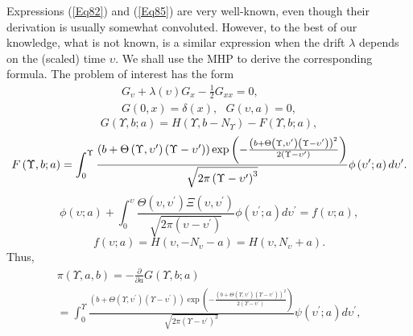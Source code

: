 \documentclass{article}
\begin{document}
Expressions (\ref{Eq82}) and (\ref{Eq85}) are very well-known, even though
their derivation is usually somewhat convoluted. However, to the best of our
knowledge, what is not known, is a similar expression when the drift $%
\lambda $ depends on the (scaled) time $\upsilon $. We shall use the MHP to
derive the corresponding formula. The problem of interest has the form%
\begin{equation}
\begin{array}{c}
G_{\upsilon }+\lambda \left( \upsilon \right) G_{x}-\frac{1}{2}G_{xx}=0, \\ 
G\left( 0,x\right) =\delta \left( x\right) ,\ \ \ G(\upsilon ,a)=0,%
\end{array}
\label{Eq86}
\end{equation}%
\begin{equation}
G\left( \Upsilon ,b;a\right) =H\left( \Upsilon ,b-N_{\Upsilon }\right)
-F\left( \Upsilon ,b;a\right) ,  \label{Eq87}
\end{equation}%
\begingroup\small
\begin{equation}
F\left( \Upsilon ,b;a\right) =\int_{0}^{\Upsilon }\frac{\left( b+\Theta
\left( \Upsilon ,\upsilon ^{\prime }\right) \left( \Upsilon -\upsilon
^{\prime }\right) \right) \exp \left( -\frac{\left( b+\Theta \left( \Upsilon
,\upsilon ^{\prime }\right) \left( \Upsilon -\upsilon ^{\prime }\right)
\right) ^{2}}{2\left( \Upsilon -\upsilon ^{\prime }\right) }\right) }{\sqrt{%
2\pi \left( \Upsilon -\upsilon ^{\prime }\right) ^{3}}}\phi \left( \upsilon
^{\prime };a\right) d\upsilon ^{\prime }.  \label{Eq88}
\end{equation}%
\endgroup
\begin{equation}
\phi \left( \upsilon ;a\right) +\int_{0}^{\upsilon }\frac{\Theta \left(
\upsilon ,\upsilon ^{\prime }\right) \Xi \left( \upsilon ,\upsilon ^{\prime
}\right) }{\sqrt{2\pi \left( \upsilon -\upsilon ^{\prime }\right) }}\phi
\left( \upsilon ^{\prime };a\right) d\upsilon ^{\prime }=f\left( \upsilon
;a\right) ,  \label{Eq89}
\end{equation}%
\begin{equation}
f\left( \upsilon ;a\right) =H\left( \upsilon ,-N_{\upsilon }-a\right)
=H\left( \upsilon ,N_{\upsilon }+a\right) .  \label{Eq90}
\end{equation}%
Thus,%
\begin{equation}
\begin{array}{c}
\pi \left( \Upsilon ,a,b\right) =-\frac{\partial }{\partial a}G\left(
\Upsilon ,b;a\right) \\ 
=\int_{0}^{\Upsilon }\frac{\left( b+\Theta \left( \Upsilon ,\upsilon
^{\prime }\right) \left( \Upsilon -\upsilon ^{\prime }\right) \right) \exp
\left( -\frac{\left( b+\Theta \left( \Upsilon ,\upsilon ^{\prime }\right)
\left( \Upsilon -\upsilon ^{\prime }\right) \right) ^{2}}{2\left( \Upsilon
-\upsilon ^{\prime }\right) }\right) }{\sqrt{2\pi \left( \Upsilon -\upsilon
^{\prime }\right) ^{3}}}\psi \left( \upsilon ^{\prime };a\right) d\upsilon
^{\prime },%
\end{array}
\label{Eq91}
\end{equation}%
\end{document}

